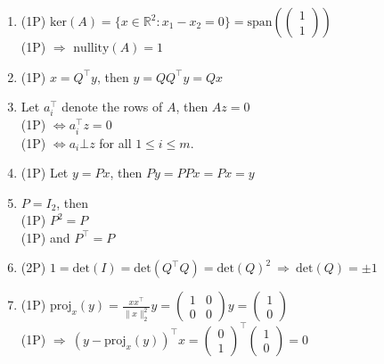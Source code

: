 {\color{solution}
\begin{enumerate}
	\item\textcolor{exampoints}{(1P)}  $\text{ker}(A)=\{x\in\mathbb{R}^2\colon x_1 -x_2= 0\}=\text{span}(\begin{pmatrix}
	1\\1
	\end{pmatrix})$\\
	\textcolor{exampoints}{(1P)} $\Rightarrow$ $\text{nullity}(A)=1$
	\item \textcolor{exampoints}{(1P)} $x = Q^\top y$, then $y=QQ^\top y =Qx $
	\item  Let $a_i^\top$ denote the rows of $A$, then $Az = 0$\\
	 \textcolor{exampoints}{(1P)}  $\iff a_i^\top z = 0$\\
	 \textcolor{exampoints}{(1P)}  $ \iff a_i \bot z$ for all $1\leq i \leq m$.
	\item \textcolor{exampoints}{(1P)} Let $y= Px$, then $Py = PPx = Px = y$
	\item  $P= I_2$, then\\
	 \textcolor{exampoints}{(1P)} $P^2 = P$\\
	 \textcolor{exampoints}{(1P)}  and $P^\top = P$
	\item \textcolor{exampoints}{(2P)} $1 = \text{det}(I) = \text{det}(Q^\top Q)=\text{det}(Q)^2 ~\Rightarrow~\text{det}(Q)=\pm 1$
	\item \textcolor{exampoints}{(1P)}  $\text{proj}_x(y) = \frac{xx^\top}{\|x\|^2_2}  y= \begin{pmatrix}
	 1 &0\\0&0
	\end{pmatrix}y = \begin{pmatrix}
	1 \\0
	\end{pmatrix}$\\
	\textcolor{exampoints}{(1P)} $ \Rightarrow~(y - \text{proj}_x(y))^\top x = \begin{pmatrix}
	0 \\1
	\end{pmatrix}^\top\begin{pmatrix}
	1 \\0
	\end{pmatrix}=0$

\end{enumerate}
}
